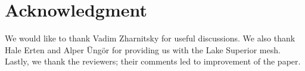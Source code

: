 \documentclass[final]{siamltex}
\begin{document}
\section*{Acknowledgment}
We would like to thank Vadim Zharnitsky for useful discussions.
We also thank Hale Erten and Alper \"Ung\"or for providing us
with the Lake Superior mesh.  Lastly, we thank
the reviewers; their comments led to improvement of the paper.



\end{document}
